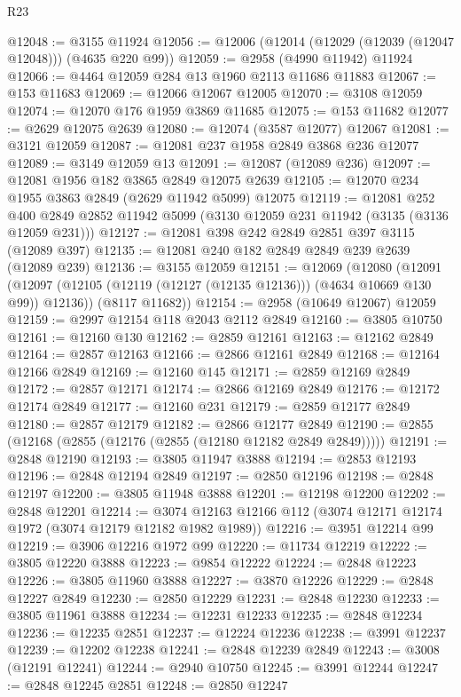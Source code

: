 \begin{lexlean}{R23}
\begin{coremodule}
@12048 := @3155 @11924
@12056 := @12006 (@12014 (@12029 (@12039 (@12047 @12048))) (@4635 @220 @99))
@12059 := @2958 (@4990 @11942) @11924
@12066 := @4464 @12059 @284 @13 @1960 @2113 @11686 @11883
@12067 := @153 @11683
@12069 := @12066 @12067 @12005
@12070 := @3108 @12059
@12074 := @12070 @176 @1959 @3869 @11685
@12075 := @153 @11682
@12077 := @2629 @12075 @2639
@12080 := @12074 (@3587 @12077) @12067
@12081 := @3121 @12059
@12087 := @12081 @237 @1958 @2849 @3868 @236 @12077
@12089 := @3149 @12059 @13
@12091 := @12087 (@12089 @236)
@12097 := @12081 @1956 @182 @3865 @2849 @12075 @2639
@12105 := @12070 @234 @1955 @3863 @2849 (@2629 @11942 @5099) @12075
@12119 := @12081
    @252
    @400
    @2849
    @2852
    @11942
    @5099
    (@3130 @12059 @231 @11942 (@3135 (@3136 @12059 @231)))
@12127 := @12081 @398 @242 @2849 @2851 @397 @3115 (@12089 @397)
@12135 := @12081 @240 @182 @2849 @2849 @239 @2639 (@12089 @239)
@12136 := @3155 @12059
@12151 := @12069
    (@12080
      (@12091 (@12097 (@12105 (@12119 (@12127 (@12135 @12136))) (@4634 @10669 @130 @99)) @12136))
      (@8117 @11682))
@12154 := @2958 (@10649 @12067) @12059
@12159 := @2997 @12154 @118 @2043 @2112 @2849
@12160 := @3805 @10750
@12161 := @12160 @130
@12162 := @2859 @12161
@12163 := @12162 @2849
@12164 := @2857 @12163
@12166 := @2866 @12161 @2849
@12168 := @12164 @12166 @2849
@12169 := @12160 @145
@12171 := @2859 @12169 @2849
@12172 := @2857 @12171
@12174 := @2866 @12169 @2849
@12176 := @12172 @12174 @2849
@12177 := @12160 @231
@12179 := @2859 @12177 @2849
@12180 := @2857 @12179
@12182 := @2866 @12177 @2849
@12190 := @2855 (@12168 (@2855 (@12176 (@2855 (@12180 @12182 @2849 @2849)))))
@12191 := @2848 @12190
@12193 := @3805 @11947 @3888
@12194 := @2853 @12193
@12196 := @2848 @12194 @2849
@12197 := @2850 @12196
@12198 := @2848 @12197
@12200 := @3805 @11948 @3888
@12201 := @12198 @12200
@12202 := @2848 @12201
@12214 := @3074 @12163 @12166 @112 (@3074 @12171 @12174 @1972 (@3074 @12179 @12182 @1982 @1989))
@12216 := @3951 @12214 @99
@12219 := @3906 @12216 @1972 @99
@12220 := @11734 @12219
@12222 := @3805 @12220 @3888
@12223 := @9854 @12222
@12224 := @2848 @12223
@12226 := @3805 @11960 @3888
@12227 := @3870 @12226
@12229 := @2848 @12227 @2849
@12230 := @2850 @12229
@12231 := @2848 @12230
@12233 := @3805 @11961 @3888
@12234 := @12231 @12233
@12235 := @2848 @12234
@12236 := @12235 @2851
@12237 := @12224 @12236
@12238 := @3991 @12237
@12239 := @12202 @12238
@12241 := @2848 @12239 @2849
@12243 := @3008 (@12191 @12241)
@12244 := @2940 @10750
@12245 := @3991 @12244
@12247 := @2848 @12245 @2851
@12248 := @2850 @12247

\end{coremodule}
\end{lexlean}
